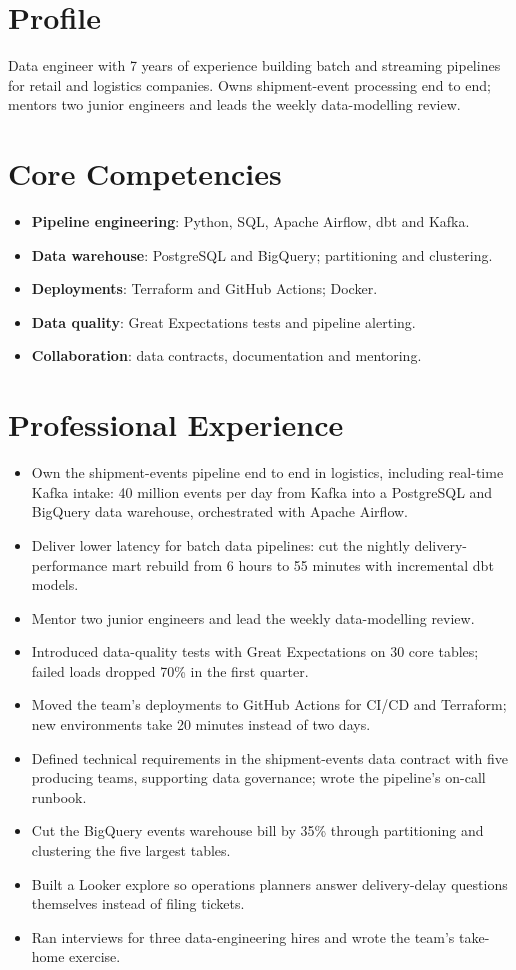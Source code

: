 \documentclass[11pt,a4paper,sans]{moderncv}
\begin{document}
\makecvtitle
\section{Profile}
Data engineer with 7 years of experience building batch and streaming pipelines for retail and logistics companies. Owns shipment-event processing end to end; mentors two junior engineers and leads the weekly data-modelling review.

\section{Core Competencies}
\begin{itemize}
\item \textbf{Pipeline engineering}: Python, SQL, Apache Airflow, dbt and Kafka.
\item \textbf{Data warehouse}: PostgreSQL and BigQuery; partitioning and clustering.
\item \textbf{Deployments}: Terraform and GitHub Actions; Docker.
\item \textbf{Data quality}: Great Expectations tests and pipeline alerting.
\item \textbf{Collaboration}: data contracts, documentation and mentoring.
\end{itemize}

\section{Professional Experience}
\begin{itemize}
\item Own the shipment-events pipeline end to end in logistics, including real-time Kafka intake: 40 million events per day from Kafka into a PostgreSQL and BigQuery data warehouse, orchestrated with Apache Airflow.
\item Deliver lower latency for batch data pipelines: cut the nightly delivery-performance mart rebuild from 6 hours to 55 minutes with incremental dbt models.
\item Mentor two junior engineers and lead the weekly data-modelling review.
\item Introduced data-quality tests with Great Expectations on 30 core tables; failed loads dropped 70\% in the first quarter.
\item Moved the team's deployments to GitHub Actions for CI/CD and Terraform; new environments take 20 minutes instead of two days.
\item Defined technical requirements in the shipment-events data contract with five producing teams, supporting data governance; wrote the pipeline's on-call runbook.
\item Cut the BigQuery events warehouse bill by 35\% through partitioning and clustering the five largest tables.
\item Built a Looker explore so operations planners answer delivery-delay questions themselves instead of filing tickets.
\item Ran interviews for three data-engineering hires and wrote the team's take-home exercise.
\end{itemize}
\end{document}
